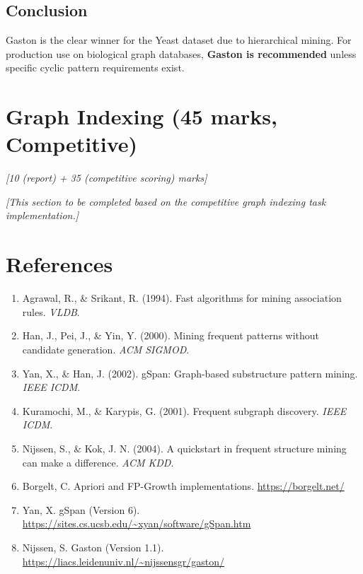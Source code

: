 \documentclass[11pt,a4paper]{article}
\begin{document}
\subsection{Conclusion}

Gaston is the clear winner for the Yeast dataset due to hierarchical mining. For production use on biological graph databases, \textbf{Gaston is recommended} unless specific cyclic pattern requirements exist.

\newpage
\section{Graph Indexing (45 marks, Competitive)}
\textit{[10 (report) + 35 (competitive scoring) marks]}

\textit{[This section to be completed based on the competitive graph indexing task implementation.]}

\newpage
\section*{References}

\begin{enumerate}
    \item Agrawal, R., \& Srikant, R. (1994). Fast algorithms for mining association rules. \textit{VLDB}.
    \item Han, J., Pei, J., \& Yin, Y. (2000). Mining frequent patterns without candidate generation. \textit{ACM SIGMOD}.
    \item Yan, X., \& Han, J. (2002). gSpan: Graph-based substructure pattern mining. \textit{IEEE ICDM}.
    \item Kuramochi, M., \& Karypis, G. (2001). Frequent subgraph discovery. \textit{IEEE ICDM}.
    \item Nijssen, S., \& Kok, J. N. (2004). A quickstart in frequent structure mining can make a difference. \textit{ACM KDD}.
    \item Borgelt, C. Apriori and FP-Growth implementations. \url{https://borgelt.net/}
    \item Yan, X. gSpan (Version 6). \url{https://sites.cs.ucsb.edu/~xyan/software/gSpan.htm}
    \item Nijssen, S. Gaston (Version 1.1). \url{https://liacs.leidenuniv.nl/~nijssensgr/gaston/}
\end{enumerate}
\end{document}
